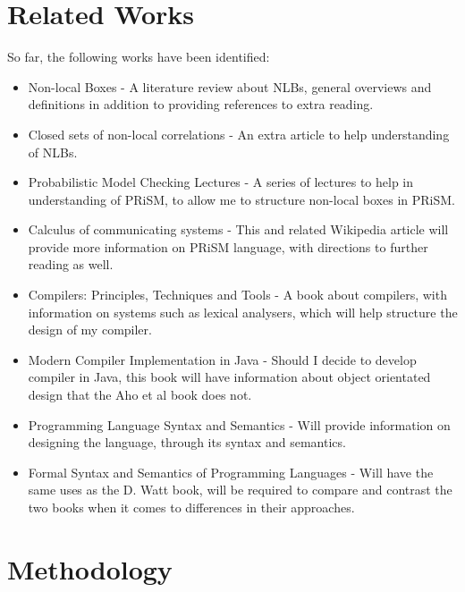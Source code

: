 \documentclass[11pt, a4paper]{article}
\begin{document}

\section{Related Works} %
\label{sec:related_works}
So far, the following works have been identified:
\begin{itemize}
    \item Non-local Boxes\cite{nlb_lamontague} - A literature review about
    NLBs, general overviews and definitions in addition to providing references
    to extra reading.
    \item Closed sets of non-local correlations\cite{Jonathan-Allcock:2009pd} -
    An extra article to help understanding of NLBs.
    \item Probabilistic Model Checking Lectures\cite{prism_lectures} - A series
    of lectures to help in understanding of PRiSM, to allow me to structure
    non-local boxes in PRiSM.
    \item Calculus of communicating systems - This and related Wikipedia article
    will provide more information on PRiSM language, with directions to further
    reading as well. 
    \item Compilers: Principles, Techniques and Tools\cite{dragon_compiler} - A
    book about compilers, with information on systems such as lexical analysers,
    which will help structure the design of my compiler.
    \item Modern Compiler Implementation in Java\cite{java_compiler} - Should I
    decide to develop compiler in Java, this book will have information about
    object orientated design that the Aho et al book does not.
    \item Programming Language Syntax and Semantics\cite{plss} - Will provide
    information on designing the language, through its syntax and semantics.
    \item Formal Syntax and Semantics of Programming Languages\cite{fsspl} -
    Will have the same uses as the D. Watt book, will be required to compare and
    contrast the two books when it comes to differences in their approaches.
\end{itemize}


\section{Methodology} %
\label{sec:methodology}
\end{document}
